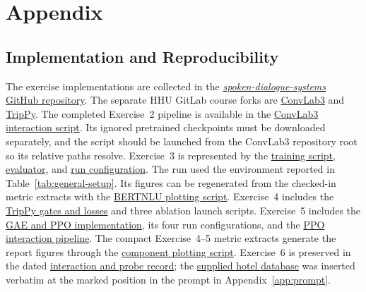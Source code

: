 \documentclass[11pt]{article}
\begin{document}
\section{Appendix}\label{sec:appendix}

\subsection{Implementation and Reproducibility}
The exercise implementations are collected in the
\href{https://github.com/x4ahmed/spoken-dialogue-systems}
{\textit{spoken-dialogue-systems} GitHub repository}. The separate HHU GitLab
course forks are
\href{https://git.hhu.de/fiw89rif/convlab3}{ConvLab3} and
\href{https://git.hhu.de/fiw89rif/trippy}{TripPy}. The completed Exercise~2
pipeline is available in the
\href{https://github.com/x4ahmed/spoken-dialogue-systems/blob/main/convlab3/examples/agent_examples/interact.py}
{ConvLab3 interaction script}. Its ignored pretrained checkpoints must be
downloaded separately, and the script should be launched from the ConvLab3
repository root so its relative paths resolve. Exercise~3 is represented by the
\href{https://github.com/x4ahmed/spoken-dialogue-systems/blob/main/convlab3/convlab/nlu/jointBERT/train.py}
{training script},
\href{https://github.com/x4ahmed/spoken-dialogue-systems/blob/main/convlab3/convlab/nlu/evaluate_unified_datasets.py}
{evaluator}, and
\href{https://github.com/x4ahmed/spoken-dialogue-systems/blob/main/convlab3/convlab/nlu/jointBERT/unified_datasets/configs/simplemultiwoz21_user_context3_exercise3.json}
{run configuration}. The run used the environment reported in
Table~\ref{tab:general-setup}. Its figures can be regenerated from the
checked-in metric extracts with the
\href{https://github.com/x4ahmed/spoken-dialogue-systems/blob/main/Report/scripts/plot_bertnlu_evaluation.py}
{BERTNLU plotting script}. Exercise~4 includes the
\href{https://github.com/x4ahmed/spoken-dialogue-systems/blob/main/trippy/modeling_dst.py}
{TripPy gates and losses} and three ablation launch scripts. Exercise~5
includes the
\href{https://github.com/x4ahmed/spoken-dialogue-systems/blob/main/convlab3/convlab/policy/ppo/ppo.py}
{GAE and PPO implementation}, its four run configurations, and the
\href{https://github.com/x4ahmed/spoken-dialogue-systems/blob/main/convlab3/examples/agent_examples/interact_ppo.py}
{PPO interaction pipeline}. The compact Exercise~4--5 metric extracts generate
the report figures through the
\href{https://github.com/x4ahmed/spoken-dialogue-systems/blob/main/Report/scripts/plot_dst_policy_evaluation.py}
{component plotting script}. Exercise~6 is preserved in the dated
\href{https://github.com/x4ahmed/spoken-dialogue-systems/blob/main/Report/data/exercise6_interactions.md}
{interaction and probe record}; the
\href{https://github.com/x4ahmed/spoken-dialogue-systems/blob/main/Report/Instructions/Tasks/hotel_db_small.json}
{supplied hotel database} was inserted verbatim at the marked position in the
prompt in Appendix~\ref{app:prompt}.
\end{document}
